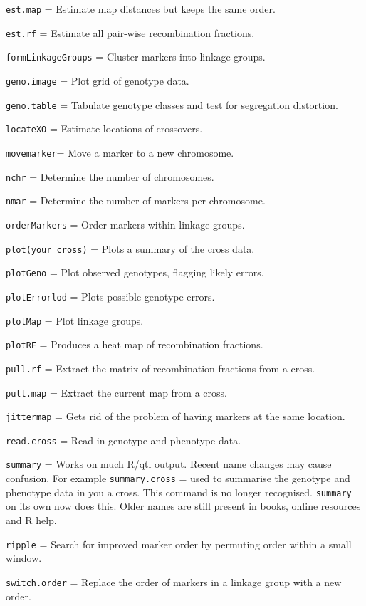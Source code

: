 \documentclass[
]{book}
\begin{document}
\texttt{est.map} = Estimate map distances but keeps the same order.

\texttt{est.rf} = Estimate all pair-wise recombination fractions.

\texttt{formLinkageGroups} = Cluster markers into linkage groups.

\texttt{geno.image} = Plot grid of genotype data.

\texttt{geno.table} = Tabulate genotype classes and test for segregation distortion.

\texttt{locateXO} = Estimate locations of crossovers.

\texttt{movemarker}= Move a marker to a new chromosome.

\texttt{nchr} = Determine the number of chromosomes.

\texttt{nmar} = Determine the number of markers per chromosome.

\texttt{orderMarkers} = Order markers within linkage groups.

\texttt{plot(your\ cross)} = Plots a summary of the cross data.

\texttt{plotGeno} = Plot observed genotypes, flagging likely errors.

\texttt{plotErrorlod} = Plots possible genotype errors.

\texttt{plotMap} = Plot linkage groups.

\texttt{plotRF} = Produces a heat map of recombination fractions.

\texttt{pull.rf} = Extract the matrix of recombination fractions from a cross.

\texttt{pull.map} = Extract the current map from a cross.

\texttt{jittermap} = Gets rid of the problem of having markers at the same location.

\texttt{read.cross} = Read in genotype and phenotype data.

\texttt{summary} = Works on much R/qtl output. Recent name changes may cause confusion. For example \texttt{summary.cross} = used to summarise the genotype and phenotype data in you a cross. This command is no longer recognised. \texttt{summary} on its own now does this. Older names are still present in books, online resources and R help.

\texttt{ripple} = Search for improved marker order by permuting order within a small window.

\texttt{switch.order} = Replace the order of markers in a linkage group with a new order.
\end{document}
